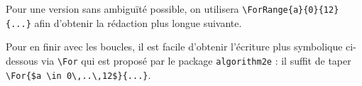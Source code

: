 \medskip


Pour une version sans ambiguïté possible, on utilisera \verb+\ForRange{a}{0}{12}{...}+ afin d'obtenir la rédaction plus longue suivante.

\begin{algo}[.55]
\end{algo}


\medskip


Pour en finir avec les boucles, il est facile d'obtenir l'écriture plus symbolique ci-dessous via \verb+\For+ qui est proposé par le package \verb+algorithm2e+ : il suffit de taper \verb+\For{$a \in 0\,..\,12$}{...}+.

\begin{algo}[.55]
\end{algo}
